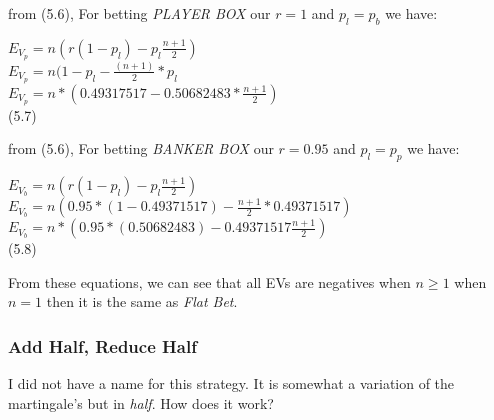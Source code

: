 \documentclass{article}
\begin{document}
from (5.6), For betting \emph{PLAYER BOX} our $r=1$ and $p_l=p_b$ we have:
\begin{center}
$E_{V_p}=n(r(1-p_l)-p_l\frac{n+1}{2})$\\
$E_{V_p}=n(1-p_l-\frac{(n+1)}{2}*p_l$\\
$E_{V_p}=n*(0.49317517-0.50682483*\frac{n+1}{2})$\\ 
(5.7) \\
\end{center}

\begin{center}
\end{center}
from (5.6), For betting \emph{BANKER BOX} our $r=0.95$ and $p_l=p_p$ we have:
\begin{center}
$E_{V_b}=n(r(1-p_l)-p_l\frac{n+1}{2})$\\
$E_{V_b}=n(0.95*(1-0.49371517)-\frac{n+1}{2}*0.49371517)$\\
$E_{V_b}=n*(0.95*(0.50682483)-0.49371517\frac{n+1}{2})$\\
(5.8) \\
\end{center}
\begin{center}
\end{center}
From these equations, we can see that all EVs are negatives when $n\geq1$ when $n=1$ then it is the same as \emph{Flat Bet}. \\

\subsubsection{Add Half, Reduce Half}
I did not have a name for this strategy.  It is somewhat a variation of the martingale's but in \emph{half}.  How does it work?  \\
\end{document}
